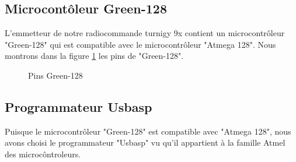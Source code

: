 	\subsection{Microcontôleur Green-128}
	L'emmetteur de notre radiocommande turnigy 9x contient un microcontrôleur "Green-128" qui est compatible avec le microcontrôleur  "Atmega 128". Nous montrons dans la figure \ref{fig:G.128} les pins de "Green-128". 
	\begin{figure}[H]
		\begin{center}
			\centering
		\end{center}
		\caption{\label{fig:G.128} Pins Green-128}
	\end{figure}
	
	\subsection{Programmateur Usbasp}
	Puisque le microcontrôleur "Green-128" est compatible avec "Atmega 128", nous avons choisi le programmateur "Usbasp" vu qu'il appartient à la famille Atmel des microcôntroleurs. 
	
